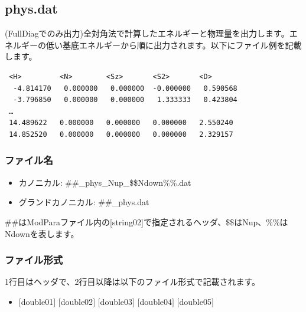 \newpage
\subsection{phys.dat}
\label{Subsec:phys}
(FullDiagでのみ出力)全対角法で計算したエネルギーと物理量を出力します。エネルギーの低い基底エネルギーから順に出力されます。以下にファイル例を記載します。\\
\begin{minipage}{12.5cm}
\begin{screen}
\begin{verbatim}
 <H>         <N>        <Sz>       <S2>       <D> 
  -4.814170   0.000000   0.000000  -0.000000   0.590568
  -3.796850   0.000000   0.000000   1.333333   0.423804
 …
 14.489622   0.000000   0.000000   0.000000   2.550240
 14.852520   0.000000   0.000000   0.000000   2.329157
\end{verbatim}
\end{screen}
\end{minipage}

\subsubsection{ファイル名}
\begin{itemize}
   \item {カノニカル:} \#\#\_phys\_Nup\_\$\$Ndown\%\%.dat
   \item {グランドカノニカル:} \#\#\_phys.dat
 \end{itemize}
  \#\#はModParaファイル内の[string02]で指定されるヘッダ、\$\$はNup、\%\%はNdownを表します。

\subsubsection{ファイル形式}
1行目はヘッダで、2行目以降は以下のファイル形式で記載されます。
 \begin{itemize}
   \item $[$double01$]$ $[$double02$]$ $[$double03$]$ $[$double04$]$ $[$double05$]$
  \end{itemize}
